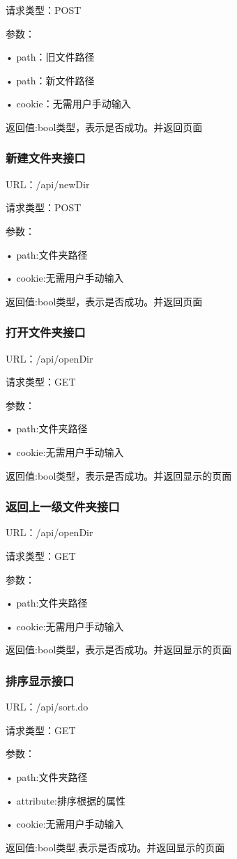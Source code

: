 请求类型：POST

参数：

• path：旧文件路径

• path：新文件路径

• cookie：无需用户手动输入

返回值:bool类型，表示是否成功。并返回页面

\subsubsection{新建文件夹接口}
URL：/api/newDir

请求类型：POST

参数：

• path:文件夹路径

• cookie:无需用户手动输入

返回值:bool类型，表示是否成功。并返回页面

\subsubsection{打开文件夹接口}
URL：/api/openDir

请求类型：GET

参数：

• path:文件夹路径

• cookie:无需用户手动输入

返回值:bool类型，表示是否成功。并返回显示的页面
\subsubsection{返回上一级文件夹接口}
URL：/api/openDir

请求类型：GET

参数：

• path:文件夹路径

• cookie:无需用户手动输入

返回值:bool类型，表示是否成功。并返回显示的页面

\subsubsection{排序显示接口}
URL：/api/sort.do

请求类型：GET

参数：

• path:文件夹路径

• attribute:排序根据的属性

• cookie:无需用户手动输入

返回值:bool类型,表示是否成功。并返回显示的页面

